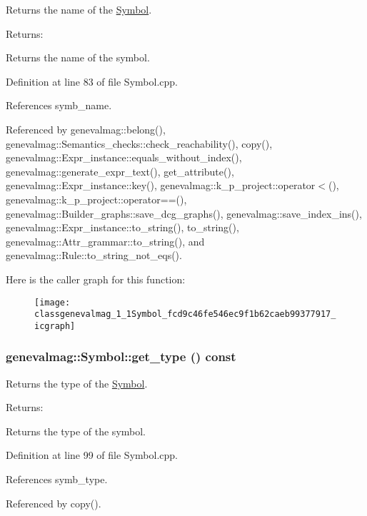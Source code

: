 Returns the name of the \hyperlink{classgenevalmag_1_1Symbol}{Symbol}. \begin{Desc}
\item[Returns:]\end{Desc}
Returns the name of the symbol. 

Definition at line 83 of file Symbol.cpp.

References symb\_\-name.

Referenced by genevalmag::belong(), genevalmag::Semantics\_\-checks::check\_\-reachability(), copy(), genevalmag::Expr\_\-instance::equals\_\-without\_\-index(), genevalmag::generate\_\-expr\_\-text(), get\_\-attribute(), genevalmag::Expr\_\-instance::key(), genevalmag::k\_\-p\_\-project::operator$<$(), genevalmag::k\_\-p\_\-project::operator==(), genevalmag::Builder\_\-graphs::save\_\-dcg\_\-graphs(), genevalmag::save\_\-index\_\-ins(), genevalmag::Expr\_\-instance::to\_\-string(), to\_\-string(), genevalmag::Attr\_\-grammar::to\_\-string(), and genevalmag::Rule::to\_\-string\_\-not\_\-eqs().

Here is the caller graph for this function:\nopagebreak
\begin{figure}[H]
\begin{center}
\leavevmode
\texttt{[image: classgenevalmag\_1\_1Symbol\_fcd9c46fe546ec9f1b62caeb99377917\_icgraph]}
\end{center}
\end{figure}
\hypertarget{classgenevalmag_1_1Symbol_fc8f4add5f5fd5c93b469f18392e932d}{
\subsubsection[{get\_\-type}]{ genevalmag::Symbol::get\_\-type () const}}
\label{classgenevalmag_1_1Symbol_fc8f4add5f5fd5c93b469f18392e932d}


Returns the type of the \hyperlink{classgenevalmag_1_1Symbol}{Symbol}. \begin{Desc}
\item[Returns:]\end{Desc}
Returns the type of the symbol. 

Definition at line 99 of file Symbol.cpp.

References symb\_\-type.

Referenced by copy().

